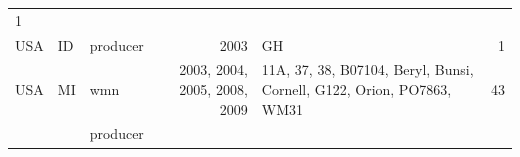 \documentclass[fleqn,10pt,lineno]{wlpeerj} %
\theoremstyle{definition}
\theoremstyle{definition}
\theoremstyle{definition}
\theoremstyle{remark}
\begin{document}
\begin{longtable}[]{@{}lllrlr@{}}
\begin{minipage}[t]{0.04\columnwidth}
1\strut
\end{minipage}\tabularnewline
\begin{minipage}[t]{0.11\columnwidth}\raggedright\strut
USA\strut
\end{minipage} & \begin{minipage}[t]{0.08\columnwidth}\raggedright\strut
ID\strut
\end{minipage} & \begin{minipage}[t]{0.12\columnwidth}\raggedright\strut
producer\strut
\end{minipage} & \begin{minipage}[t]{0.19\columnwidth}\raggedleft\strut
2003\strut
\end{minipage} & \begin{minipage}[t]{0.29\columnwidth}\raggedright\strut
GH\strut
\end{minipage} & \begin{minipage}[t]{0.04\columnwidth}\raggedleft\strut
1\strut
\end{minipage}\tabularnewline
\begin{minipage}[t]{0.11\columnwidth}\raggedright\strut
USA\strut
\end{minipage} & \begin{minipage}[t]{0.08\columnwidth}\raggedright\strut
MI\strut
\end{minipage} & \begin{minipage}[t]{0.12\columnwidth}\raggedright\strut
wmn\strut
\end{minipage} & \begin{minipage}[t]{0.19\columnwidth}\raggedleft\strut
2003, 2004, 2005, 2008, 2009\strut
\end{minipage} & \begin{minipage}[t]{0.29\columnwidth}\raggedright\strut
11A, 37, 38, B07104, Beryl, Bunsi, Cornell, G122, Orion, PO7863,
WM31\strut
\end{minipage} & \begin{minipage}[t]{0.04\columnwidth}\raggedleft\strut
43\strut
\end{minipage}\tabularnewline
\begin{minipage}[t]{0.11\columnwidth}\raggedright\strut
\strut
\end{minipage} & \begin{minipage}[t]{0.08\columnwidth}\raggedright\strut
\strut
\end{minipage} & \begin{minipage}[t]{0.12\columnwidth}\raggedright\strut
producer\strut
\end{minipage} & \begin{minipage}[t]{0.19\columnwidth}\raggedleft\strut

\end{minipage}
\end{longtable}
\end{document}
